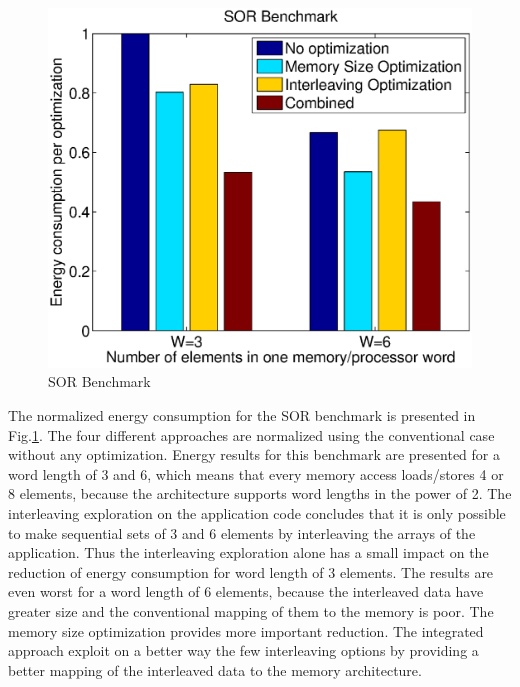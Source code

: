 \documentclass[prodmode,acmtodaes]{acmsmall}
\begin{document}
\begin{figure}
\centering
	\caption{SOR Benchmark}
	\label{fig:sor}
	\includegraphics[scale = 0.5]{Images/sor.eps} 
\end{figure}

The normalized energy consumption for the SOR benchmark is presented in Fig.\ref{fig:sor}.
The four different approaches are normalized using the conventional case without any optimization.
Energy results for this benchmark are presented for a word length of 3 and 6, which means that every memory access loads/stores 4 or 8 elements, because the architecture supports word lengths in the power of 2. 
The interleaving exploration on the application code concludes that it is only possible to make sequential sets of 3 and 6 elements by interleaving the arrays of the application.
Thus the interleaving exploration alone has a small impact on the reduction of energy consumption for word length of 3 elements.
The results are even worst for a word length of 6 elements, because the interleaved data have greater size and the conventional mapping of them to the memory is poor.
The memory size optimization provides more important reduction.
The integrated approach exploit on a better way the few interleaving options by providing a better mapping of the interleaved data to the memory architecture.
\end{document}
